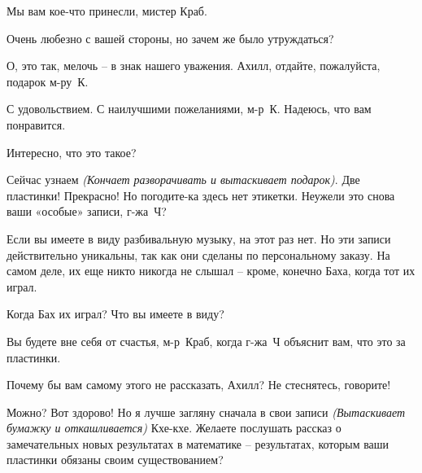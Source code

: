 \documentclass[../main.tex]{subfiles}
\begin{document}



\begin{dialogue}

 Мы вам кое-что принесли, мистер Краб.

 Очень любезно с вашей стороны, но зачем же было утруждаться?

 О, это так, мелочь \--- в знак нашего уважения. Ахилл, отдайте, пожалуйста, подарок м-ру~К.

 С удовольствием. С наилучшими пожеланиями, м-р~К\@. Надеюсь, что вам понравится.


 Интересно, что это такое?

 Сейчас узнаем \emph{(Кончает разворачивать и вытаскивает подарок)}. Две пластинки! Прекрасно! Но погодите-ка здесь нет этикетки. Неужели это снова ваши «особые» записи, г-жа~Ч?

 Если вы имеете в виду разбивальную музыку, на этот раз нет. Но эти записи действительно уникальны, так как они сделаны по персональному заказу. На самом деле, их еще никто никогда не слышал \--- кроме, конечно Баха, когда тот их играл.

 Когда Бах их играл? Что вы имеете в виду?

 Вы будете вне себя от счастья, м-р~Краб, когда г-жа~Ч объяснит вам, что это за пластинки.

 Почему бы вам самому этого не рассказать, Ахилл? Не стеснятесь, говорите!

 Можно? Вот здорово! Но я лучше загляну сначала в свои записи \emph{(Вытаскивает бумажку и откашливается)} Кхе-кхе. Желаете послушать рассказ о замечательных новых результатах в математике \--- результатах, которым ваши пластинки обязаны своим существованием?


\end{dialogue}
\end{document}
